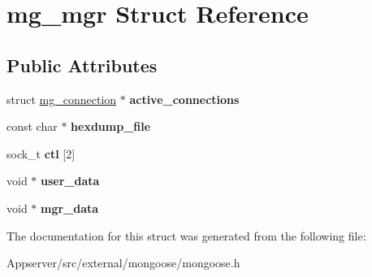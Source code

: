 \hypertarget{structmg__mgr}{}\section{mg\+\_\+mgr Struct Reference}
\label{structmg__mgr}
\subsection*{Public Attributes}
\begin{DoxyCompactItemize}
\item 
struct \hyperlink{structmg__connection}{mg\+\_\+connection} $\ast$ {\bfseries active\+\_\+connections}\hypertarget{structmg__mgr_abb2e9f2e7a4851f22e84da9f87d9cca2}{}\label{structmg__mgr_abb2e9f2e7a4851f22e84da9f87d9cca2}

\item 
const char $\ast$ {\bfseries hexdump\+\_\+file}\hypertarget{structmg__mgr_a010041366e665854c3bca2295efe481f}{}\label{structmg__mgr_a010041366e665854c3bca2295efe481f}

\item 
sock\+\_\+t {\bfseries ctl} \mbox{[}2\mbox{]}\hypertarget{structmg__mgr_a80810246498c0939bfe26919623ec9e9}{}\label{structmg__mgr_a80810246498c0939bfe26919623ec9e9}

\item 
void $\ast$ {\bfseries user\+\_\+data}\hypertarget{structmg__mgr_ac2e8ed98ad341f9f58bfd3add2c6bdc6}{}\label{structmg__mgr_ac2e8ed98ad341f9f58bfd3add2c6bdc6}

\item 
void $\ast$ {\bfseries mgr\+\_\+data}\hypertarget{structmg__mgr_a561fc1e92cff59f0f1c5d57909bedb29}{}\label{structmg__mgr_a561fc1e92cff59f0f1c5d57909bedb29}

\end{DoxyCompactItemize}


The documentation for this struct was generated from the following file\+:\begin{DoxyCompactItemize}
\item 
Appserver/src/external/mongoose/mongoose.\+h\end{DoxyCompactItemize}
